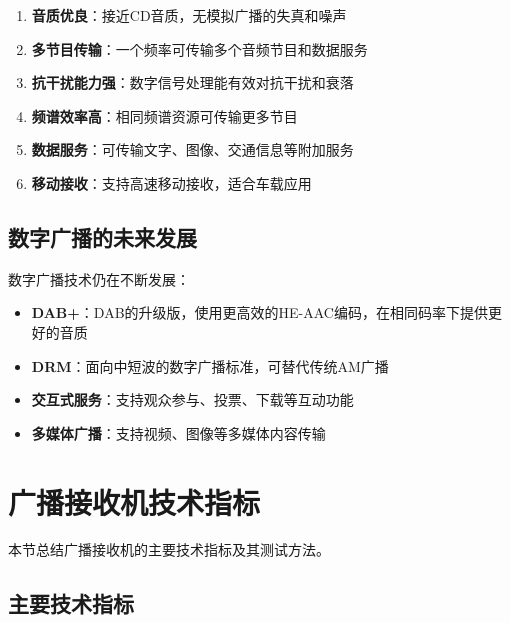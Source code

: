 \begin{enumerate}
    \item \textbf{音质优良}：接近CD音质，无模拟广播的失真和噪声
    \item \textbf{多节目传输}：一个频率可传输多个音频节目和数据服务
    \item \textbf{抗干扰能力强}：数字信号处理能有效对抗干扰和衰落
    \item \textbf{频谱效率高}：相同频谱资源可传输更多节目
    \item \textbf{数据服务}：可传输文字、图像、交通信息等附加服务
    \item \textbf{移动接收}：支持高速移动接收，适合车载应用
\end{enumerate}

\subsection{数字广播的未来发展}
\label{sec:digital_broadcast_future}

数字广播技术仍在不断发展：

\begin{itemize}
    \item \textbf{DAB+}：DAB的升级版，使用更高效的HE-AAC编码，在相同码率下提供更好的音质
    \item \textbf{DRM}：面向中短波的数字广播标准，可替代传统AM广播
    \item \textbf{交互式服务}：支持观众参与、投票、下载等互动功能
    \item \textbf{多媒体广播}：支持视频、图像等多媒体内容传输
\end{itemize}

\section{广播接收机技术指标}
\label{sec:broadcast_receiver_specs}

本节总结广播接收机的主要技术指标及其测试方法。

\subsection{主要技术指标}
\label{sec:receiver_main_specs}

